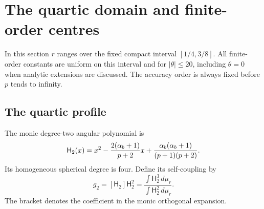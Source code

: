 \section{The quartic domain and finite-order centres}\label{inf:sec-centres}

In this section $r$ ranges over the fixed compact interval
$[1/4,3/8]$. All finite-order constants are uniform on this interval
and for $|\theta|\le20$, including $\theta=0$ when analytic
extensions are discussed. The accuracy order is always fixed before
$p$ tends to infinity.

\subsection{The quartic profile}

The monic degree-two angular polynomial is
\begin{equation}\label{inf:H2}
 \mathsf H_2(x)=x^2-\frac{2(\alpha_b+1)}{p+2}x
                 +\frac{\alpha_b(\alpha_b+1)}{(p+1)(p+2)}.
\end{equation}
Its homogeneous spherical degree is four. Define its self-coupling by
\begin{equation}\label{inf:seed-coupling}
 g_2=[\mathsf H_2]\mathsf H_2^2
 =\frac{\int \mathsf H_2^3\,d\mu_r}{\int \mathsf H_2^2\,d\mu_r}.
\end{equation}
The bracket denotes the coefficient in the monic orthogonal expansion.

